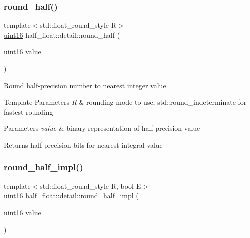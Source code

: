 \mbox{\label{namespacehalf__float_1_1detail_ad83f9ae057a78ad84ac6a35a3f9b5509}} 
\subsubsection{\texorpdfstring{round\+\_\+half()}{round\_half()}}
{\footnotesize\ttfamily template$<$std\+::float\+\_\+round\+\_\+style R$>$ \\
\hyperlink{namespacehalf__float_1_1detail_a239ec58092b4e4849b444baee1a01088}{uint16} half\+\_\+float\+::detail\+::round\+\_\+half (\begin{DoxyParamCaption}\item[{\hyperlink{namespacehalf__float_1_1detail_a239ec58092b4e4849b444baee1a01088}{uint16}}]{value }\end{DoxyParamCaption})}

Round half-\/precision number to nearest integer value. 
\begin{DoxyTemplParams}{Template Parameters}
{\em R} & rounding mode to use, {\ttfamily std\+::round\+\_\+indeterminate} for fastest rounding \\
\hline
\end{DoxyTemplParams}

\begin{DoxyParams}{Parameters}
{\em value} & binary representation of half-\/precision value \\
\hline
\end{DoxyParams}
\begin{DoxyReturn}{Returns}
half-\/precision bits for nearest integral value 
\end{DoxyReturn}
\mbox{\label{namespacehalf__float_1_1detail_ab4e14ce718b27e88bd319bbac32b6d1c}} 
\subsubsection{\texorpdfstring{round\+\_\+half\+\_\+impl()}{round\_half\_impl()}}
{\footnotesize\ttfamily template$<$std\+::float\+\_\+round\+\_\+style R, bool E$>$ \\
\hyperlink{namespacehalf__float_1_1detail_a239ec58092b4e4849b444baee1a01088}{uint16} half\+\_\+float\+::detail\+::round\+\_\+half\+\_\+impl (\begin{DoxyParamCaption}\item[{\hyperlink{namespacehalf__float_1_1detail_a239ec58092b4e4849b444baee1a01088}{uint16}}]{value }\end{DoxyParamCaption})}

